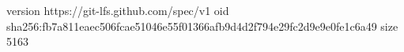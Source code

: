 version https://git-lfs.github.com/spec/v1
oid sha256:fb7a811eaec506fcae51046e55f01366afb9d4d2f794e29fc2d9e9e0fe1c6a49
size 5163
